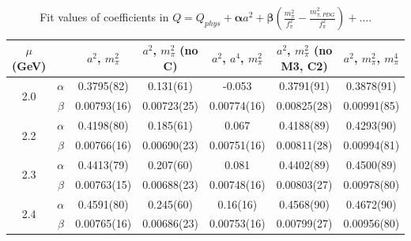 \documentclass[12pt]{extarticle}
\begin{document}
\begin{table}[h!]
\begin{center}
\begin{tabular}{|c c|c|c|c|c|c|}
\hline
$\mu$ (GeV) &  & $a^2$, $m_\pi^2$& $a^2$, $m_\pi^2$ (no C)& $a^2$, $a^4$, $m_\pi^2$& $a^2$, $m_\pi^2$ (no M3, C2)& $a^2$, $m_\pi^2$, $m_\pi^4$\\
\hline
\multirow{2}{0.5in}{2.0} & $\alpha$ & 0.3795(82)& 0.131(61)& -0.053& 0.3791(91)& 0.3878(91)\\
 & $\beta$ & 0.00793(16)& 0.00723(25)& 0.00774(16)& 0.00825(28)& 0.00991(85)\\
\hline
\multirow{2}{0.5in}{2.2} & $\alpha$ & 0.4198(80)& 0.185(61)& 0.067& 0.4188(89)& 0.4293(90)\\
 & $\beta$ & 0.00766(16)& 0.00690(23)& 0.00751(16)& 0.00811(28)& 0.00994(81)\\
\hline
\multirow{2}{0.5in}{2.3} & $\alpha$ & 0.4413(79)& 0.207(60)& 0.081& 0.4402(89)& 0.4500(89)\\
 & $\beta$ & 0.00763(15)& 0.00688(23)& 0.00748(16)& 0.00803(27)& 0.00978(80)\\
\hline
\multirow{2}{0.5in}{2.4} & $\alpha$ & 0.4591(80)& 0.245(60)& 0.16(16)& 0.4568(90)& 0.4672(90)\\
 & $\beta$ & 0.00765(16)& 0.00686(23)& 0.00753(16)& 0.00799(27)& 0.00956(80)\\
\hline
\end{tabular}
\caption{Fit values of coefficients in $Q = Q_{phys} + \mathbf{\alpha} a^2 + \mathbf{\beta}\left(\frac{m_\pi^2}{f_\pi^2}-\frac{m_{\pi,PDG}^2}{f_\pi^2}\right) + \ldots$.}
\end{center}
\end{table}




















\clearpage
\end{document}
